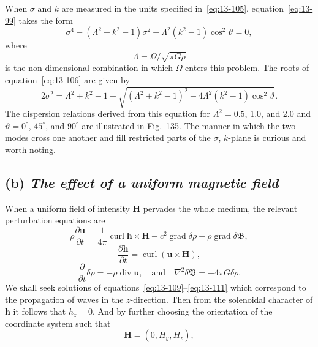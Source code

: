 When $\sigma$ and $k$ are measured in the units specified in~\eqref{eq:13-105}, equation~\eqref{eq:13-99} takes the form
\begin{equation}
\label{eq:13-106}
\sigma^4 - (\Lambda^2+k^2-1)\sigma^2+\Lambda^2(k^2-1)\cos^2\!\vartheta = 0,
\end{equation}
where
\begin{equation}
\label{eq:13-107}
\Lambda = \Omega/\sqrt{\pi G\rho}
\end{equation}
is the non-dimensional combination in which $\Omega$ enters this problem. The roots of equation~\eqref{eq:13-106} are given by
\begin{equation}
\label{eq:13-108}
2\sigma^2 = \Lambda^2+k^2-1 \pm \sqrt{(\Lambda^2+k^2-1)^2-4\Lambda^2(k^2-1)\cos^2\!\vartheta}.
\end{equation}
The dispersion relations derived from this equation for $\Lambda^2 = 0.5$, 1.0, and 2.0 and $\vartheta = 0^\circ$, $45^\circ$, and $90^\circ$ are illustrated in Fig.~135. The manner in which the two modes cross one another and fill restricted parts of the $\sigma$, $k$-plane is curious and worth noting.

\subsection*{(b) \textit{The effect of a uniform magnetic field}}

When a uniform field of intensity $\mathbf{H}$ pervades the whole medium, the relevant perturbation equations are
\begin{equation}
\label{eq:13-109}
\rho\frac{\partial\mathbf{u}}{\partial t} = \frac{1}{4\pi}\operatorname{curl}\mathbf{h}\times\mathbf{H} - c^2\operatorname{grad}\delta\rho + \rho\operatorname{grad}\delta\mathfrak{B},
\end{equation}
\begin{equation}
\label{eq:13-110}
\frac{\partial\mathbf{h}}{\partial t} = \operatorname{curl}(\mathbf{u}\times\mathbf{H}),
\end{equation}
\begin{equation}
\label{eq:13-111}
\frac{\partial}{\partial t}\delta\rho = -\rho\operatorname{div}\mathbf{u}, \quad \text{and} \quad \nabla^2\delta\mathfrak{B} = -4\pi G\delta\rho.
\end{equation}
We shall seek solutions of equations~\eqref{eq:13-109}--\eqref{eq:13-111} which correspond to the propagation of waves in the $z$-direction. Then from the solenoidal character of $\mathbf{h}$ it follows that $h_z = 0$. And by further choosing the orientation of the coordinate system such that
\begin{equation}
\label{eq:13-112}
\mathbf{H} = (0, H_y, H_z),
\end{equation}

